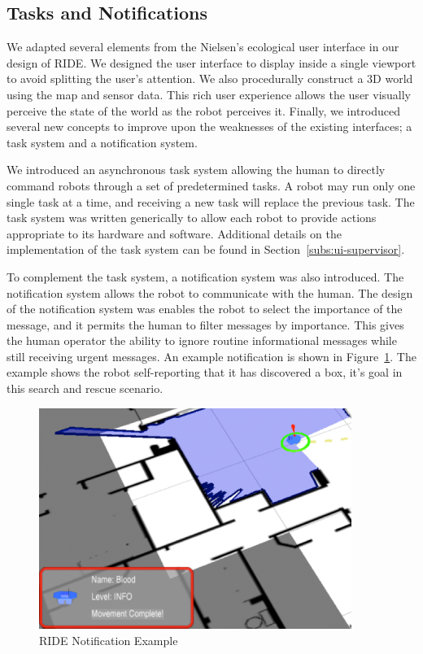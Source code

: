 \subsection{Tasks and Notifications}
We adapted several elements from the Nielsen's ecological user interface in our design of RIDE. We designed the user interface to display inside a single viewport to avoid splitting the user's attention. We also procedurally construct a 3D world using the map and sensor data. This rich user experience allows the user visually perceive the state of the world as the robot perceives it. Finally, we introduced several new concepts to improve upon the weaknesses of the existing interfaces; a task system and a notification system.

We introduced an asynchronous task system allowing the human to directly command robots through a set of predetermined tasks. A robot may run only one single task at a time, and receiving a new task will replace the previous task. The task system was written generically to allow each robot to provide actions appropriate to its hardware and software. Additional details on the implementation of the task system can be found in Section~\ref{subs:ui-supervisor}.

To complement the task system, a notification system was also introduced. The notification system allows the robot to communicate with the human. The design of the notification system was enables the robot to select the importance of the message, and it permits the human to filter messages by importance. This gives the human operator the ability to ignore routine informational messages while still receiving urgent messages. An example notification is shown in Figure~\ref{fig:ride-notification}. The example shows the robot self-reporting that it has discovered a box, it's goal in this search and rescue scenario.

\begin{figure}[ht]
\begin{center}
\includegraphics[width=4in]{images/ride-notification.png}
\caption{RIDE Notification Example\label{fig:ride-notification}}
\end{center}
\end{figure}


